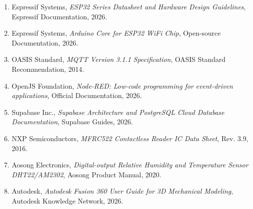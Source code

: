 \begin{enumerate}[leftmargin=0.8cm]
    \item Espressif Systems, \textit{ESP32 Series Datasheet and Hardware Design Guidelines}, Espressif Documentation, 2026.
    \item Espressif Systems, \textit{Arduino Core for ESP32 WiFi Chip}, Open-source Documentation, 2026.
    \item OASIS Standard, \textit{MQTT Version 3.1.1 Specification}, OASIS Standard Recommendation, 2014.
    \item OpenJS Foundation, \textit{Node-RED: Low-code programming for event-driven applications}, Official Documentation, 2026.
    \item Supabase Inc., \textit{Supabase Architecture and PostgreSQL Cloud Database Documentation}, Supabase Guides, 2026.
    \item NXP Semiconductors, \textit{MFRC522 Contactless Reader IC Data Sheet}, Rev. 3.9, 2016.
    \item Aosong Electronics, \textit{Digital-output Relative Humidity and Temperature Sensor DHT22/AM2302}, Aosong Product Manual, 2020.
    \item Autodesk, \textit{Autodesk Fusion 360 User Guide for 3D Mechanical Modeling}, Autodesk Knowledge Network, 2026.
\end{enumerate}
